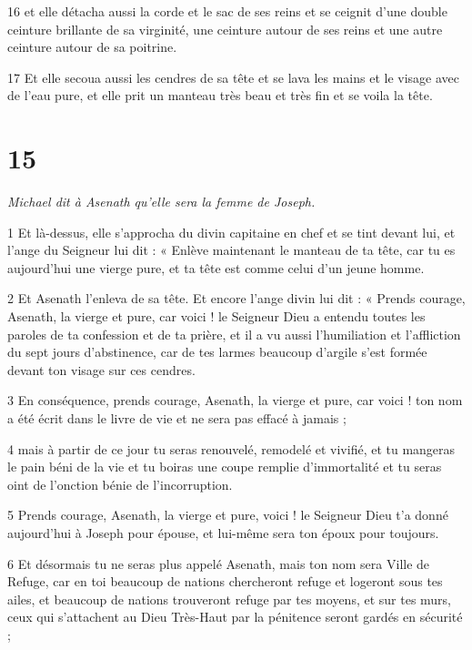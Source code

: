 \par 16 et elle détacha aussi la corde et le sac de ses reins et se ceignit d'une double ceinture brillante de sa virginité, une ceinture autour de ses reins et une autre ceinture autour de sa poitrine.

\par 17 Et elle secoua aussi les cendres de sa tête et se lava les mains et le visage avec de l'eau pure, et elle prit un manteau très beau et très fin et se voila la tête.

\chapter{15}

\par \textit{Michael dit à Asenath qu'elle sera la femme de Joseph.}

\par 1 Et là-dessus, elle s'approcha du divin capitaine en chef et se tint devant lui, et l'ange du Seigneur lui dit : « Enlève maintenant le manteau de ta tête, car tu es aujourd'hui une vierge pure, et ta tête est comme celui d’un jeune homme.

\par 2 Et Asenath l'enleva de sa tête. Et encore l'ange divin lui dit : « Prends courage, Asenath, la vierge et pure, car voici ! le Seigneur Dieu a entendu toutes les paroles de ta confession et de ta prière, et il a vu aussi l'humiliation et l'affliction du sept jours d'abstinence, car de tes larmes beaucoup d'argile s'est formée devant ton visage sur ces cendres.

\par 3 En conséquence, prends courage, Asenath, la vierge et pure, car voici ! ton nom a été écrit dans le livre de vie et ne sera pas effacé à jamais ;

\par 4 mais à partir de ce jour tu seras renouvelé, remodelé et vivifié, et tu mangeras le pain béni de la vie et tu boiras une coupe remplie d'immortalité et tu seras oint de l'onction bénie de l'incorruption.

\par 5 Prends courage, Asenath, la vierge et pure, voici ! le Seigneur Dieu t'a donné aujourd'hui à Joseph pour épouse, et lui-même sera ton époux pour toujours.

\par 6 Et désormais tu ne seras plus appelé Asenath, mais ton nom sera Ville de Refuge, car en toi beaucoup de nations chercheront refuge et logeront sous tes ailes, et beaucoup de nations trouveront refuge par tes moyens, et sur tes murs, ceux qui s'attachent au Dieu Très-Haut par la pénitence seront gardés en sécurité ;

